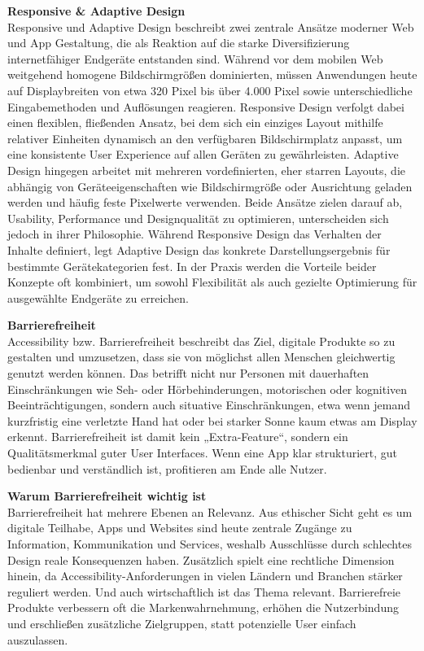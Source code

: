 \vspace{0.5em}
\textbf{Responsive \& Adaptive Design}\\
Responsive und Adaptive Design beschreibt zwei zentrale Ansätze moderner Web und App Gestaltung, die als Reaktion auf die starke Diversifizierung 
internetfähiger Endgeräte entstanden sind. Während vor dem mobilen Web weitgehend homogene Bildschirmgrößen dominierten, müssen Anwendungen heute 
auf Displaybreiten von etwa 320 Pixel bis über 4.000 Pixel sowie unterschiedliche Eingabemethoden und Auflösungen reagieren. Responsive Design 
verfolgt dabei einen flexiblen, fließenden Ansatz, bei dem sich ein einziges Layout mithilfe relativer Einheiten dynamisch an den verfügbaren Bildschirmplatz anpasst, um eine konsistente 
User Experience auf allen Geräten zu gewährleisten. Adaptive Design hingegen arbeitet mit mehreren vordefinierten, eher starren Layouts, die 
abhängig von Geräteeigenschaften wie Bildschirmgröße oder Ausrichtung geladen werden und häufig feste Pixelwerte verwenden. Beide Ansätze zielen 
darauf ab, Usability, Performance und Designqualität zu optimieren, unterscheiden sich jedoch in ihrer Philosophie. Während Responsive Design das 
Verhalten der Inhalte definiert, legt Adaptive Design das konkrete Darstellungsergebnis für bestimmte Gerätekategorien fest. In der Praxis werden 
die Vorteile beider Konzepte oft kombiniert, um sowohl Flexibilität als auch gezielte Optimierung für ausgewählte Endgeräte zu erreichen. \cite{Ionos_responsive_design} \cite{kinsta_responsive_vs_adaptive}

\vspace{0.5em}
\textbf{Barrierefreiheit}\\
Accessibility bzw. Barrierefreiheit beschreibt das Ziel, digitale Produkte so zu gestalten und umzusetzen, dass sie von möglichst allen Menschen 
gleichwertig genutzt werden können. Das betrifft nicht nur Personen mit dauerhaften Einschränkungen wie Seh- oder Hörbehinderungen, motorischen oder 
kognitiven Beeinträchtigungen, sondern auch situative Einschränkungen, etwa wenn jemand kurzfristig eine verletzte Hand hat oder bei starker Sonne kaum 
etwas am Display erkennt. Barrierefreiheit ist damit kein „Extra-Feature“, sondern ein Qualitätsmerkmal guter User Interfaces. Wenn eine App klar strukturiert, gut 
bedienbar und verständlich ist, profitieren am Ende alle Nutzer. \cite{uxmatters} \cite{materialdesign}

\vspace{0.5em}
\textbf{Warum Barrierefreiheit wichtig ist}\\
Barrierefreiheit hat mehrere Ebenen an Relevanz. Aus ethischer Sicht geht es um digitale Teilhabe, Apps und Websites sind heute zentrale Zugänge zu Information, 
Kommunikation und Services, weshalb Ausschlüsse durch schlechtes Design reale Konsequenzen haben. Zusätzlich spielt eine rechtliche Dimension hinein, 
da Accessibility-Anforderungen in vielen Ländern und Branchen stärker reguliert werden. Und auch wirtschaftlich ist das Thema relevant. Barrierefreie 
Produkte verbessern oft die Markenwahrnehmung, erhöhen die Nutzerbindung und erschließen zusätzliche Zielgruppen, statt potenzielle User einfach 
auszulassen.\cite{uxmatters} \cite{materialdesign}

